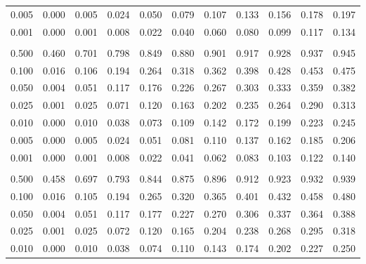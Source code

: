 \documentclass[
]{article}
\begin{document}
\begin{longtable}[t]{lrrrrrrrrrr}
\hspace{1em}0.005 & 0.000 & 0.005 & 0.024 & 0.050 & 0.079 & 0.107 & 0.133 & 0.156 & 0.178 & 0.197\\
\hspace{1em}0.001 & 0.000 & 0.001 & 0.008 & 0.022 & 0.040 & 0.060 & 0.080 & 0.099 & 0.117 & 0.134\\
\addlinespace[0.3em]
\multicolumn{11}{l}{\textbf{$k_2=60$}}\\
\hspace{1em}0.500 & 0.460 & 0.701 & 0.798 & 0.849 & 0.880 & 0.901 & 0.917 & 0.928 & 0.937 & 0.945\\
\hspace{1em}0.100 & 0.016 & 0.106 & 0.194 & 0.264 & 0.318 & 0.362 & 0.398 & 0.428 & 0.453 & 0.475\\
\hspace{1em}0.050 & 0.004 & 0.051 & 0.117 & 0.176 & 0.226 & 0.267 & 0.303 & 0.333 & 0.359 & 0.382\\
\hspace{1em}0.025 & 0.001 & 0.025 & 0.071 & 0.120 & 0.163 & 0.202 & 0.235 & 0.264 & 0.290 & 0.313\\
\hspace{1em}0.010 & 0.000 & 0.010 & 0.038 & 0.073 & 0.109 & 0.142 & 0.172 & 0.199 & 0.223 & 0.245\\
\hspace{1em}0.005 & 0.000 & 0.005 & 0.024 & 0.051 & 0.081 & 0.110 & 0.137 & 0.162 & 0.185 & 0.206\\
\hspace{1em}0.001 & 0.000 & 0.001 & 0.008 & 0.022 & 0.041 & 0.062 & 0.083 & 0.103 & 0.122 & 0.140\\
\addlinespace[0.3em]
\multicolumn{11}{l}{\textbf{$k_2=120$}}\\
\hspace{1em}0.500 & 0.458 & 0.697 & 0.793 & 0.844 & 0.875 & 0.896 & 0.912 & 0.923 & 0.932 & 0.939\\
\hspace{1em}0.100 & 0.016 & 0.105 & 0.194 & 0.265 & 0.320 & 0.365 & 0.401 & 0.432 & 0.458 & 0.480\\
\hspace{1em}0.050 & 0.004 & 0.051 & 0.117 & 0.177 & 0.227 & 0.270 & 0.306 & 0.337 & 0.364 & 0.388\\
\hspace{1em}0.025 & 0.001 & 0.025 & 0.072 & 0.120 & 0.165 & 0.204 & 0.238 & 0.268 & 0.295 & 0.318\\
\hspace{1em}0.010 & 0.000 & 0.010 & 0.038 & 0.074 & 0.110 & 0.143 & 0.174 & 0.202 & 0.227 & 0.250\\

\end{longtable}
\end{document}
